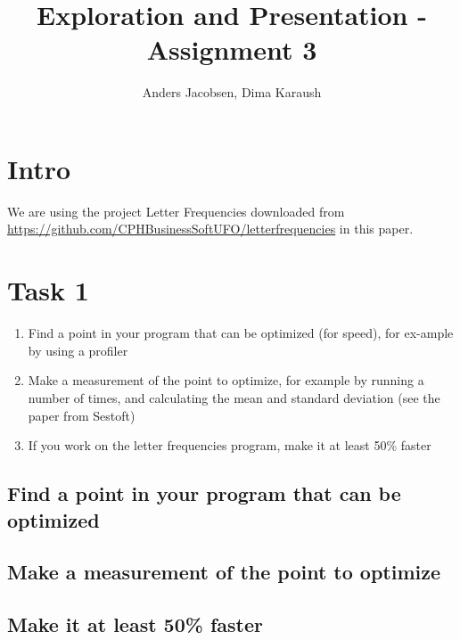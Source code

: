 \documentclass{article}
\author{Anders Jacobsen, Dima Karaush}
\title{Exploration and Presentation - Assignment 3}
\begin{document}
\maketitle

\newpage
\tableofcontents

\newpage
\section*{Intro}
We are using the project Letter Frequencies downloaded 
from \url{https://github.com/CPHBusinessSoftUFO/letterfrequencies} 
in this paper. 

\section{Task 1}
\begin{enumerate}
    \item Find a point in your program that can be optimized (for speed), 
    for ex-ample by using a profiler
    \item Make a measurement of the point to optimize, for example by 
    running a number of times, and calculating the mean and standard 
    deviation (see the paper from Sestoft)
    \item If you work on the letter frequencies program, make it at least 50\% faster
\end{enumerate}

\subsection{Find a point in your program that can be optimized}

\subsection{Make a measurement of the point to optimize}

\subsection{Make it at least 50\% faster}
\end{document}
